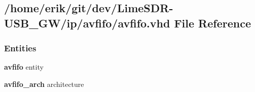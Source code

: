 \subsection{/home/erik/git/dev/\+Lime\+S\+D\+R-\/\+U\+S\+B\+\_\+\+G\+W/ip/avfifo/avfifo.vhd File Reference}
\label{ip_2avfifo_2avfifo_8vhd}
\subsubsection*{Entities}
\begin{DoxyCompactItemize}
\item 
{\bf avfifo} entity
\item 
{\bf avfifo\+\_\+arch} architecture
\end{DoxyCompactItemize}
